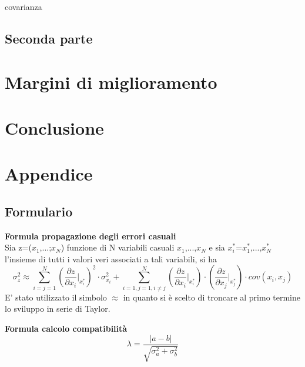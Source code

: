 \documentclass[a4paper,11pt,oneside]{article}
\begin{document}
covarianza



\subsection{Seconda parte}

\section{Margini di miglioramento}
\section{Conclusione}
\newpage
\section{Appendice}
\subsection{Formulario}
\textbf{Formula propagazione degli errori casuali}\\
Sia z=($x_1$,...;$x_N$) funzione di N variabili casuali $x_1$,...,$x_N$ e sia ${x_i^\ast}$={$x_1^\ast$,...,$x_N^{\ast}$} l'insieme di tutti i valori veri associati a tali variabili, si ha 
\begin{equation*}\label{eq:teorema_varianze}
    \sigma_z^{2}\approx  \sum_{i=j=1}^{N}\left ( \frac{\partial z}{\partial x_i}\Big|_{x_i^{\ast}} \right )^{2}\cdot\sigma_{x_i}^{2} +\sum_{i=1,j=1,i\neq j}^{N}\left (\frac{\partial z }{\partial x_i}\Big|_{x_i^{\ast}} \right ) \cdot \left ( \frac{\partial z}{\partial x_j} \Big|_{x_j^{\ast}} \right )\cdot cov(x_i,x_j)
\end{equation*}
E' stato utilizzato il simbolo $\approx$ in quanto si è scelto di troncare al primo termine lo sviluppo in serie di Taylor.

\textbf{Formula calcolo compatibilità}\\
\begin{equation*}
    \lambda=\frac{\left|a-b\right|}{\sqrt{\sigma^{2}_{a}+\sigma^{2}_{b}}}
\end{equation*}\\
\end{document}
